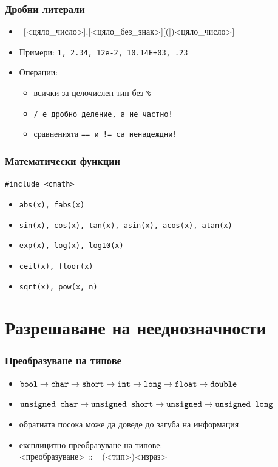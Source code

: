 \documentclass{beamer}
\begin{document}
\begin{frame}
  \frametitle{Дробни литерали}
  \begin{itemize}
  \item\ [<цяло\_число>]\tta.[<цяло\_без\_знак>][(|)<цяло\_число>]
  \item Примери: \tt1, \tt{2.34}, \tt{12e-2}, \tt{10.14E+03}, \tt{.23}
  \item Операции:
    \begin{itemize}
    \item всички за целочислен тип \alert{без \tt\%}
    \item \tt/ е \alert{дробно деление}, а не частно!
    \item сравненията \tt{==} и \tt{!=} са \alert{ненадеждни}!
    \end{itemize}
  \end{itemize}
\end{frame}


\begin{frame}[fragile]
  \frametitle{Математически функции}
  \lstinline{#include <cmath>}
  \begin{itemize}
  \item \tt{abs(x)}, \tt{fabs(x)}
  \item \tt{sin(x)}, \tt{cos(x)}, \tt{tan(x)}, \tt{asin(x)}, \tt{acos(x)}, \tt{atan(x)}
  \item \tt{exp(x)}, \tt{log(x)}, \tt{log10(x)}
  \item \tt{ceil(x)}, \tt{floor(x)}
  \item \tt{sqrt(x)}, \tt{pow(x, n)}
  \end{itemize}
\end{frame}

\section{Разрешаване на нееднозначности}

\begin{frame}
  \frametitle{Преобразуване на типове}
  \begin{itemize}
  \item $\tt{bool}\rightarrow%
    \tt{char}\rightarrow%
    \tt{short}\rightarrow%
    \tt{int}\rightarrow%
    \tt{long}\rightarrow%
    \tt{float}\rightarrow%
    \tt{double}$
  \item $\tt{unsigned char}\rightarrow%
    \tt{unsigned short}\rightarrow%
    \tt{unsigned}\rightarrow%
    \tt{unsigned long}$
  \item обратната посока може да доведе до \alert{загуба на информация}
  \item експлицитно преобразуване на типове:\\
    <преобразуване> ::= \tta(<тип>\tta)<израз>
  \end{itemize}
\end{frame}
\end{document}
